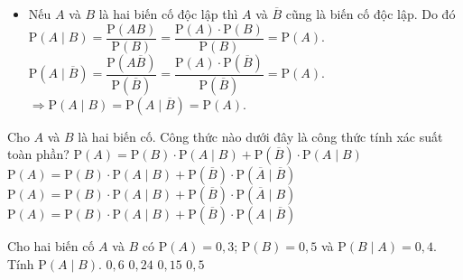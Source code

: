 \begin{ex}
{\begin{itemize}[\color{blue}\checkmark]
{			}
			\item Nếu $A$ và $B$ là hai biến cố độc lập thì $A$ và $\overline{B}$ cũng là biến cố độc lập. Do đó\\
			$\mathrm{P}\left(A \mid  B\right)=
			\dfrac{\mathrm{P}\left(AB\right)}{\mathrm{P}\left(B\right) }=
			\dfrac{\mathrm{P}\left(A\right) \cdot \mathrm{P}\left(B\right) }{\mathrm{P}\left(B\right) }
			=\mathrm{P}\left(A\right)$.\\
			$\mathrm{P}\left(A \mid  \overline{B}\right)=
			\dfrac{\mathrm{P}\left(A\overline{B}\right)}{\mathrm{P}\left(\overline{B}\right) }=
			\dfrac{\mathrm{P}\left(A\right) \cdot \mathrm{P}\left(\overline{B}\right) }{\mathrm{P}\left(\overline{B}\right) }
			=\mathrm{P}\left(A\right)$.\\
			$\Rightarrow \mathrm{P}\left(A\mid  B\right)=
			\mathrm{P}\left(A \mid  \overline{B}\right)=\mathrm{P}\left(A\right)$.
		\end{itemize}
	}
\end{ex}
\begin{ex}%
Cho $A$ và $B$ là hai biến cố. Công thức nào dưới đây là công thức tính xác suất toàn phần?
	\choice
	{$\mathrm{P}\left(A\right)= \mathrm{P}\left(B\right)\cdot \mathrm{P}\left(A\mid  B\right) + 
		\mathrm{P}\left(\overline{B}\right)\cdot \mathrm{P}\left(A\mid  B\right)$}
	{$\mathrm{P}\left(A\right)= \mathrm{P}\left(B\right)\cdot \mathrm{P}\left(A\mid  B\right) + 
		\mathrm{P}\left(\overline{B}\right)\cdot \mathrm{P}\left(\overline{A}\mid \overline{B}\right)$}
	{$\mathrm{P}\left(A\right)= \mathrm{P}\left(B\right)\cdot \mathrm{P}\left(A\mid  B\right) + 
		\mathrm{P}\left(\overline{B}\right)\cdot \mathrm{P}\left(\overline{A}\mid  B\right)$}
	{\True $\mathrm{P}\left(A\right)= \mathrm{P}\left(B\right)\cdot \mathrm{P}\left(A\mid  B\right) + 
		\mathrm{P}\left(\overline{B}\right)\cdot \mathrm{P}\left(A\mid \overline{B}\right)$}
\end{ex}
\begin{ex}%
Cho hai biến cố $A$ và $B$ có $\mathrm{P}\left(A\right) = 0{,}3$; $\mathrm{P}\left(B\right) = 0{,}5$ và
$\mathrm{P}\left(B\mid  A\right)=0{,}4$. Tính $\mathrm{P}\left(A\mid  B\right)$. 
	\choice
	{$0{,}6$}
	{\True $0{,}24$}
	{$0{,}15$}
	{$0{,}5$}
\end{ex}
